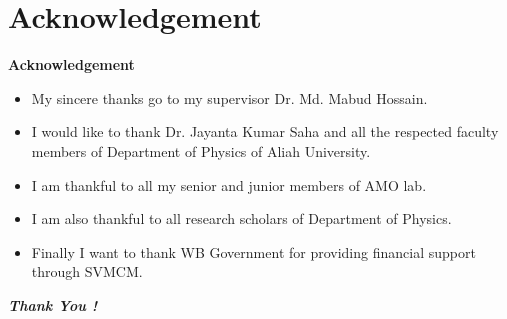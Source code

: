 \documentclass[9pt,aspectratio94]{beamer}
\begin{document}
   \section{\textbf{Acknowledgement} }
      \begin{frame}{\textbf{Acknowledgement} }
          \begin{itemize}
              \item My sincere thanks go to my supervisor Dr. Md. Mabud Hossain.
              \item I would like to thank Dr. Jayanta Kumar Saha and all the respected faculty members of Department of Physics of Aliah University.
              \item I am thankful to all my senior and junior members of AMO lab.
              \item I am also thankful to all research scholars of Department of Physics.
              \item Finally I want to thank WB Government for providing financial support through SVMCM.
          \end{itemize}
      \end{frame}
      \begin{frame}
      \begin{center}
          \Huge \textbf{\textit{Thank You !}}
      \end{center}
          
      \end{frame}
\end{document}
